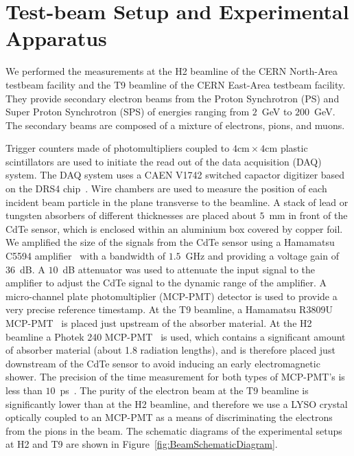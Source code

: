 \section{Test-beam Setup and Experimental Apparatus }
\label{sec:tbeam}

We performed the measurements at the H2 beamline of the CERN North-Area testbeam facility
and the T9 beamline of the CERN East-Area testbeam facility. They provide secondary electron beams 
from the Proton Synchrotron (PS) and Super Proton Synchrotron (SPS)
of energies ranging from $2$~GeV to $200$~GeV. The secondary beams are composed of 
a mixture of electrons, pions, and muons. 

Trigger counters made of photomultipliers coupled to $4 \mathrm{cm}\times 4 \mathrm{cm}$ 
plastic scintillators are used 
to initiate the read out of the data acquisition (DAQ) system. The DAQ system
uses a CAEN V1742 switched capactor digitizer based on the DRS4 chip~\cite{DRS}. Wire chambers
are used to measure the position of each incident beam particle in the plane transverse
to the beamline. A stack of lead or tungsten absorbers of different thicknesses are 
placed about $5$~mm in front of the CdTe sensor, which is 
enclosed within an aluminium box covered by copper foil. We amplified the size of the
signals from the CdTe sensor using a Hamamatsu C5594 amplifier~\cite{HamaAmpDataSheet} with a bandwidth of
$1.5$~GHz and providing a voltage gain of $36$~dB. A $10$~dB attenuator was used to attenuate the input signal 
to the amplifier to adjust the CdTe signal to the dynamic range of the amplifier. 
A micro-channel plate photomultiplier (MCP-PMT)
detector is used to provide a very precise reference timestamp. At the T9 beamline,
a Hamamatsu R3809U MCP-PMT~\cite{HamaMCPDataSheet} is placed just upstream of the absorber material. 
At the H2 beamline a Photek 240 MCP-PMT~\cite{PhotekDataSheet} is used, which contains a significant 
amount of absorber material (about 1.8 radiation lengths), and is therefore placed 
just downstream of the CdTe sensor to avoid inducing an early electromagnetic shower.
The precision of the time measurement for both types of MCP-PMT's is less than 
$10$~ps~\cite{MCPShowerMaxPaper}. The purity of the electron beam at the T9 beamline is
significantly lower than at the H2 beamline, and therefore we use a LYSO crystal
optically coupled to an MCP-PMT as a means of discriminating the electrons from the pions
in the beam. The schematic diagrams of the experimental setups at H2 and T9 
are shown in Figure~\ref{fig:BeamSchematicDiagram}. 


